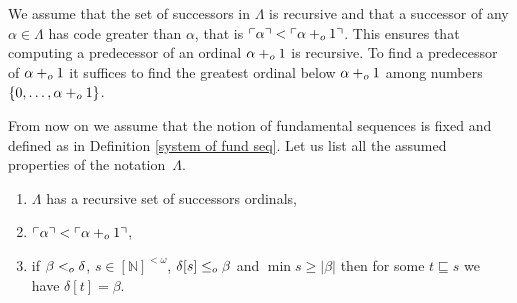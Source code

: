 \documentclass[11pt]{amsart}
\theoremstyle{definition}
\theoremstyle{remark}
\theoremstyle{plain}
\newcommand{\numberset}{\mathbb}
\newcommand{\N}{\numberset{N}}
\def\b{\beta}
\def\d{\delta}
\newcommand{\set}[1]{{\{{#1}\}}}
\newcommand{\leo}{<\sb{o}}
\newcommand{\leqo}{\leq\sb{o}}
\newcommand{\pluso}{+\sb{o}}
\newcommand{\gd}[1]{{\ulcorner{#1}\urcorner}}
\def\N{{\mathbb{N}}}
\begin{document}
We assume that the set of successors in $\Lambda$ is recursive and that a successor of any $\alpha\in\Lambda$ has code greater than $\alpha$, that is $\gd\alpha<\gd{\alpha\pluso1}$.
This ensures that computing a predecessor of an ordinal $\alpha\pluso 1$ is recursive. 
To find a predecessor of $\alpha\pluso 1$ it suffices to find the greatest ordinal below $\alpha\pluso 1$ among numbers $\set{0,\dots,\alpha\pluso 1}$.

From now on we assume that the notion of fundamental sequences is fixed and defined as in Definition \ref{system of fund seq}. 
Let us list all the assumed properties of the notation~$\Lambda$.
\begin{enumerate}
\item $\Lambda$ has a recursive set of successors ordinals,
\item $\gd\alpha<\gd{\alpha\pluso1}$,
\item if $\b \leo \d$, $s \in [\N]^{<\omega}$, $\d[s] \leqo \b$ and $\min s \ge |\b|$ then for some $t \sqsubseteq s$ we have $\d[t] = \b$.
\end{enumerate}

%
%
\end{document}
